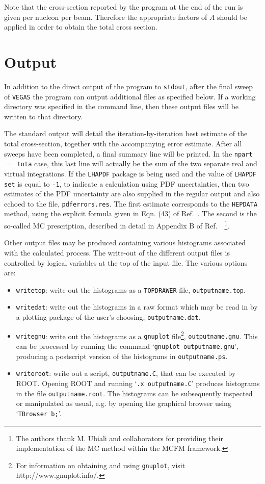 \documentclass[12pt]{article}
\begin{document}
Note that the cross-section reported by the program at the end
of the run is given per nucleon per beam. Therefore the
appropriate factors of $A$ should be applied in order to obtain
the total cross section.

\section{Output}
\label{sec:output}

In addition to the direct output of the program to {\tt stdout}, after
the final sweep of {\tt VEGAS} the program can output additional files
as specified below.
If a working directory was specified in the command line, then these
output files will be written to that directory.

The standard output will detail the iteration-by-iteration best estimate
of the total cross-section, together with the accompanying error estimate.
After all sweeps have been completed, a final summary line will be printed.
In the {\tt npart}~$=$~{\tt tota} case, this last line will actually be the
sum of the two separate real and virtual integrations.
If the {\tt LHAPDF} package is being used and the value of
{\tt LHAPDF set} is equal to {\tt -1},  to indicate a calculation using
PDF uncertainties, then two estimates of the PDF uncertainty are
also supplied in the regular output and also echoed to the file,
{\tt pdferrors.res}. The first estimate corresponds to the
{\tt HEPDATA} method, using the explicit formula given in
Eqn. (43) of Ref.~\cite{Campbell:2006wx}. The second is the so-called
MC prescription, described in detail in Appendix B of
Ref.~\cite{Ball:2008by}~\footnote{
The authors thank M. Ubiali and collaborators for providing their
implementation of the MC method within the MCFM framework.}.

Other output files may be produced containing various histograms associated
with the calculated process. The write-out of the different output files
is controlled by logical variables at the top of the input file. The various options are:
\begin{itemize}
\item {\tt writetop}:  write out the histograms as a {\tt TOPDRAWER} file,
{\tt outputname.top}.
\item {\tt writedat}:  write out the histograms in a raw format 
which may be read in by a plotting package of the user's choosing,
{\tt outputname.dat}.
\item {\tt writegnu}:  write out the histograms as a {\tt gnuplot} file\footnote{
For information on obtaining and using {\tt gnuplot}, visit http://www.gnuplot.info/.},
{\tt outputname.gnu}.  This can be processed by running the command
`{\tt gnuplot outputname.gnu}', producing a postscript version of the histograms
in  {\tt outputname.ps}.
\item {\tt writeroot}:  write out a script, {\tt outputname.C}, that
can be executed by ROOT. Opening ROOT and running `{\tt .x outputname.C}'
produces histograms in the file
{\tt outputname.root}. The histograms can be subsequently inspected or manipulated
as usual, e.g. by opening the graphical browser using `{\tt TBrowser b;}'.
\end{itemize}
\end{document}
